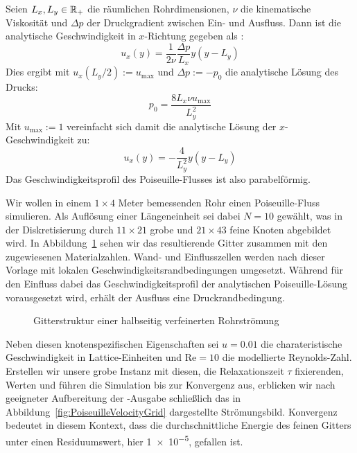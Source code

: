 \begin{Definition}
\label{def:analyticPoiseuille}
Seien \(L_x, L_y \in \mathbb{R}_+\) die räumlichen Rohrdimensionen, \(\nu\) die kinematische Viskosität und \(\Delta p\) der Druckgradient zwischen Ein- und Ausfluss. Dann ist die analytische Geschwindigkeit in \(x\)-Richtung gegeben als \cite[vgl.~Kap.~4]{Bao11}:
\[u_x(y) = \frac{1}{2\nu} \frac{\Delta p}{L_x} y (y-L_y)\]
Dies ergibt mit \(u_x(L_y/2):=u_\text{max}\) und \(\Delta p := -p_0\) die analytische Lösung des Drucks:
\[p_0 = \frac{8 L_x \nu u_\text{max} }{L_y^2}\]
Mit \(u_\text{max}:=1\) vereinfacht sich damit die analytische Lösung der \(x\)-Geschwindigkeit zu:
\[u_x(y) = -\frac{4}{L_y^2} y (y-L_y)\]
Das Geschwindigkeitsprofil des Poiseuille-Flusses ist also parabelförmig.
\end{Definition}

Wir wollen in einem \(1 \times 4\) Meter bemessenden Rohr einen Poiseuille-Fluss simulieren. Als Auflösung einer Längeneinheit sei dabei \(N=10\) gewählt, was in der Diskretisierung durch \(11 \times 21\) grobe und \(21 \times 43\) feine Knoten abgebildet wird.
In Abbildung~\ref{fig:PoiseuilleGridSetup} sehen wir das resultierende Gitter zusammen mit den zugewiesenen Materialzahlen. Wand- und Einflusszellen werden nach dieser Vorlage mit lokalen Geschwindigkeitsrandbedingungen umgesetzt. Während für den Einfluss dabei das Geschwindigkeitsprofil der analytischen Poiseuille-Lösung vorausgesetzt wird, erhält der Ausfluss eine Druckrandbedingung.

\begin{figure}[H]
\begin{adjustbox}{center}

\end{adjustbox}
\caption{Gitterstruktur einer halbseitig verfeinerten Rohrströmung}
\label{fig:PoiseuilleGridSetup}
\end{figure}

Neben diesen knotenspezifischen Eigenschaften sei \(u=\num{0.01}\) die charateristische Geschwindigkeit in Lattice-Einheiten und \(\text{Re}=10\) die modellierte Reynolds-Zahl. Erstellen wir unsere grobe  Instanz mit diesen, die Relaxationszeit \(\tau\) fixierenden, Werten und führen die Simulation bis zur Konvergenz aus, erblicken wir nach geeigneter Aufbereitung der -Ausgabe \cite[Kap.~19.3]{vtkGuide10} schließlich das in Abbildung~\ref{fig:PoiseuilleVelocityGrid} dargestellte Strömungsbild. Konvergenz bedeutet in diesem Kontext, dass die durchschnittliche Energie des feinen Gitters unter einen Residuumswert, hier \num{1e-5}, gefallen ist.

